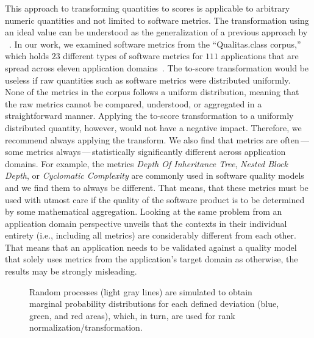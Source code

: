 This approach to transforming quantities to scores is applicable to arbitrary numeric quantities and not limited to software metrics.
The transformation using an ideal value can be understood as the generalization of a previous approach by \citeauthor{ulan2021copula}~\cite{ulan2021copula}.
In our work, we examined software metrics from the ``Qualitas.class corpus,'' which holds $23$ different types of software metrics for $111$ applications that are spread across eleven application domains~\cite{terra2013qualitas,honel2023qcc}.
The to-score transformation would be useless if raw quantities such as software metrics were distributed uniformly.
None of the metrics in the corpus follows a uniform distribution, meaning that the raw metrics cannot be compared, understood, or aggregated in a straightforward manner.
Applying the to-score transformation to a uniformly distributed quantity, however, would not have a negative impact.
Therefore, we recommend always applying the transform.
We also find that metrics are often\,---\,some metrics always\,---\,statistically significantly different across application domains.
For example, the metrics \emph{Depth Of Inheritance Tree}, \emph{Nested Block Depth}, or \emph{Cyclomatic Complexity} are commonly used in software quality models and we find them to always be different.
That means, that these metrics must be used with utmost care if the quality of the software product is to be determined by some mathematical aggregation.
Looking at the same problem from an application domain perspective unveils that the contexts in their individual entirety (i.e., including all metrics) are considerably different from each other.
That means that an application needs to be validated against a quality model that solely uses metrics from the application's target domain as otherwise, the results may be strongly misleading.



\begin{figure}[t!]
    \centering
    \makebox[\textwidth][c]{}
    \caption[Automatic Calibration of a process model using simulated random processes.]{{\small Random processes (light gray lines) are simulated to obtain marginal probability distributions for each defined deviation (blue, green, and red areas), which, in turn, are used for rank normalization/transformation.}}%
    \label{fig:ac-proc}
\end{figure}



